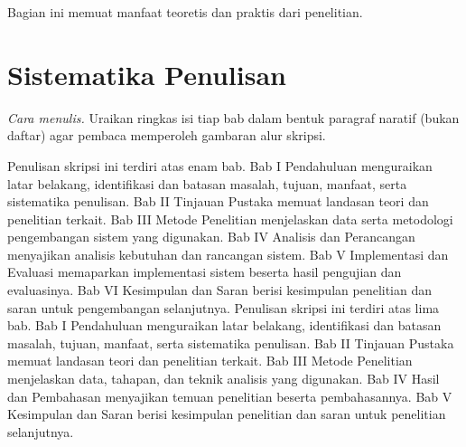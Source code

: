 Bagian ini memuat manfaat teoretis dan praktis dari penelitian.

\section{Sistematika Penulisan}
\emph{Cara menulis.} Uraikan ringkas isi tiap bab dalam bentuk paragraf naratif (bukan daftar) agar pembaca memperoleh gambaran alur skripsi.

\ifpeminatansi
Penulisan skripsi ini terdiri atas enam bab. Bab I Pendahuluan menguraikan latar
belakang, identifikasi dan batasan masalah, tujuan, manfaat, serta sistematika
penulisan. Bab II Tinjauan Pustaka memuat landasan teori dan penelitian terkait.
Bab III Metode Penelitian menjelaskan data serta metodologi pengembangan sistem
yang digunakan. Bab IV Analisis dan Perancangan menyajikan analisis kebutuhan dan
rancangan sistem. Bab V Implementasi dan Evaluasi memaparkan implementasi sistem
beserta hasil pengujian dan evaluasinya. Bab VI Kesimpulan dan Saran berisi
kesimpulan penelitian dan saran untuk pengembangan selanjutnya.
\else
Penulisan skripsi ini terdiri atas lima bab. Bab I Pendahuluan menguraikan latar
belakang, identifikasi dan batasan masalah, tujuan, manfaat, serta sistematika
penulisan. Bab II Tinjauan Pustaka memuat landasan teori dan penelitian terkait.
Bab III Metode Penelitian menjelaskan data, tahapan, dan teknik analisis yang
digunakan. Bab IV Hasil dan Pembahasan menyajikan temuan penelitian beserta
pembahasannya. Bab V Kesimpulan dan Saran berisi kesimpulan penelitian dan saran
untuk penelitian selanjutnya.
\fi

